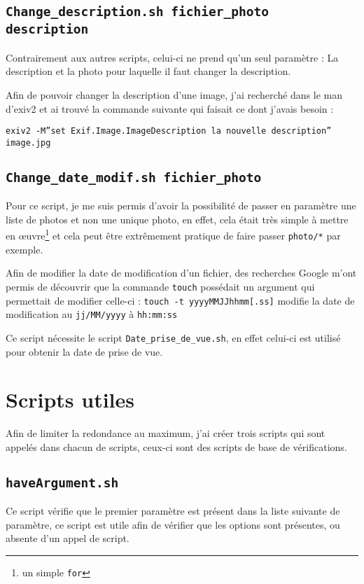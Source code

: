 \documentclass[a4paper, 11pt]{article}
\begin{document}
	\subsection{\texttt{Change\_description.sh fichier\_photo description}}
	Contrairement aux autres scripts, celui-ci ne prend qu'un seul paramètre : La description et la photo pour laquelle il faut changer la description.

	Afin de pouvoir changer la description d'une image, j'ai recherché dans le man d'exiv2 et ai trouvé la commande suivante qui faisait ce dont j'avais besoin : 

	\texttt{exiv2 -M''set Exif.Image.ImageDescription la nouvelle description'' image.jpg}
	
	\subsection{\texttt{Change\_date\_modif.sh fichier\_photo}}
	Pour ce script, je me suis permis d'avoir la possibilité de passer en paramètre une liste de photos et non une unique photo, en effet, cela était très simple
	à mettre en œuvre\footnote{un simple \texttt{for}} et cela peut être extrêmement pratique de faire passer \texttt{photo/*} par exemple.

	Afin de modifier la date de modification d'un fichier, des recherches Google m'ont permis de découvrir que la commande \texttt{touch} possédait un argument
	qui permettait de modifier celle-ci : \texttt{touch -t yyyyMMJJhhmm[.ss]} modifie la date de modification  au \texttt{jj/MM/yyyy} à \texttt{hh:mm:ss}

	Ce script nécessite le script \texttt{Date\_prise\_de\_vue.sh}, en effet celui-ci est utilisé pour obtenir la date de prise de vue.

	\section{Scripts utiles}\label{scriptsUtils}
	Afin de limiter la redondance au maximum, j'ai créer trois scripts qui sont appelés dans chacun de scripts, ceux-ci sont des scripts de base de
	vérifications.
	\subsection{\texttt{haveArgument.sh}}
	Ce script vérifie que le premier paramètre est présent dans la liste suivante de paramètre, ce script est utile afin de vérifier que les options sont
	présentes, ou absente d'un appel de script.
\end{document}
